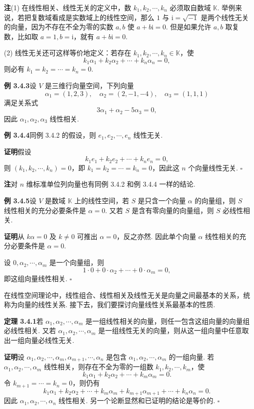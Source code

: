 \documentclass[UTF8,12pt,a4paper,fontset=fandol]{ctexart}
\begin{document}
\noindent\textbf{注}\quad (1) 在线性相关、线性无关的定义中，数 $k_1,k_2,\cdots,k_n$ 必须取自数域 $\mathbb{K}$. 举例来说，若把复数域看成是实数域上的线性空间，那么 $1$ 与 $\mathrm{i}=\sqrt{-1}$ 是两个线性无关的向量，因为不存在不全为零的实数 $a,b$ 使 $a+b\mathrm{i}=0$. 但是如果允许 $a,b$ 取复数，比如取 $a=1,b=\mathrm{i}$，就有 $a+b\mathrm{i}=0$.

(2) 线性无关还可这样等价地定义：若存在 $k_1,k_2,\cdots,k_n\in\mathbb{K}$，使
\[
k_1\alpha_1+k_2\alpha_2+\cdots+k_n\alpha_n=0,
\]
则必有 $k_1=k_2=\cdots=k_n=0$.

\noindent\textbf{例 3.4.3}\quad 设 $V$ 是三维行向量空间，下列向量
\[
\alpha_1=(1,2,3),\quad \alpha_2=(2,-1,-4),\quad \alpha_3=(1,1,1)
\]
满足关系式
\[
3\alpha_1+\alpha_2-5\alpha_3=0,
\]
因此 $\alpha_1,\alpha_2,\alpha_3$ 线性相关.

\noindent\textbf{例 3.4.4}\quad 同例 3.4.2 的假设，则 $e_1,e_2,\cdots,e_n$ 线性无关.

\noindent\textbf{证明}\quad 假设
\[
k_1e_1+k_2e_2+\cdots+k_ne_n=0,
\]
则 $(k_1,k_2,\cdots,k_n)=0$，即 $k_1=k_2=\cdots=k_n=0$，因此这 $n$ 个向量线性无关. $\square$

\noindent\textbf{注}\quad 对 $n$ 维标准单位列向量也有同例 3.4.2 和例 3.4.4 一样的结论.

\noindent\textbf{例 3.4.5}\quad 设 $V$ 是数域 $\mathbb{K}$ 上的线性空间，若 $S$ 是只含一个向量 $\alpha$ 的向量组，则 $S$ 线性相关的充分必要条件是 $\alpha=0$. 又若 $S$ 是含有零向量的向量组，则 $S$ 必线性相关.

\noindent\textbf{证明}\quad 从 $k\alpha=0$ 及 $k\neq 0$ 可推出 $\alpha=0$，反之亦然. 因此单个向量 $\alpha$ 线性相关的充分必要条件是 $\alpha=0$.

设 $0,\alpha_2,\cdots,\alpha_m$ 是一个向量组，则
\[
1\cdot 0+0\cdot\alpha_2+\cdots+0\cdot\alpha_m=0,
\]
即这组向量线性相关. $\square$

在线性空间理论中，线性组合、线性相关及线性无关是向量之间最基本的关系，统称为向量的线性关系. 接下去，我们要探讨向量线性关系最基本的性质.

\noindent\textbf{定理 3.4.1}\quad 若 $\alpha_1,\alpha_2,\cdots,\alpha_m$ 是一组线性相关的向量，则任一包含这组向量的向量组必线性相关. 又若 $\alpha_1,\alpha_2,\cdots,\alpha_m$ 是一组线性无关的向量，则从这一组向量中任意取出一组向量必线性无关.

\noindent\textbf{证明}\quad 设 $\alpha_1,\alpha_2,\cdots,\alpha_m,\alpha_{m+1},\cdots,\alpha_n$ 是包含 $\alpha_1,\alpha_2,\cdots,\alpha_m$ 的一组向量. 若 $\alpha_1,\alpha_2,\cdots,\alpha_m$ 线性相关，则存在不全为零的一组数 $k_1,k_2,\cdots,k_m$，使
\[
k_1\alpha_1+k_2\alpha_2+\cdots+k_m\alpha_m=0.
\]
令 $k_{m+1}=\cdots=k_n=0$，则仍有
\[
k_1\alpha_1+k_2\alpha_2+\cdots+k_m\alpha_m+k_{m+1}\alpha_{m+1}+\cdots+k_n\alpha_n=0.
\]
因此 $\alpha_1,\alpha_2,\cdots,\alpha_n$ 线性相关. 另一个论断显然和已证明的结论是等价的. $\square$
\end{document}
